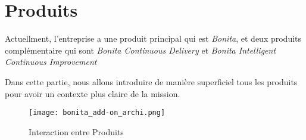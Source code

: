 \section{Produits} \label{produits}
Actuellment, l'entreprise a une produit principal qui est \emph{Bonita}, et deux produits complémentaire qui sont \textit{Bonita Continuous Delivery} et \textit{Bonita Intelligent Continuous Improvement}

Dans cette partie, nous allons introduire de manière superficiel tous les produits pour avoir un contexte plus claire de la mission.

\begin{figure}[!ht]
\centering
\texttt{[image: bonita\_add-on\_archi.png]}
\caption{Interaction entre Produits}
\label{fig:bonita_add-on}
\end{figure}




